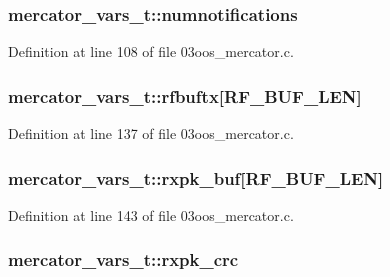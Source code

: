 \subsubsection[{\texorpdfstring{numnotifications}{numnotifications}}]{ mercator\+\_\+vars\+\_\+t\+::numnotifications}\hypertarget{structmercator__vars__t_a5c249c8cf98a5ffbaded6922aba7aac1}{}\label{structmercator__vars__t_a5c249c8cf98a5ffbaded6922aba7aac1}


Definition at line 108 of file 03oos\+\_\+mercator.\+c.

\subsubsection[{\texorpdfstring{rfbuftx}{rfbuftx}}]{ mercator\+\_\+vars\+\_\+t\+::rfbuftx\mbox{[}{\bf R\+F\+\_\+\+B\+U\+F\+\_\+\+L\+EN}\mbox{]}}\hypertarget{structmercator__vars__t_a19c0f384353ae7381a4935a5d378cd76}{}\label{structmercator__vars__t_a19c0f384353ae7381a4935a5d378cd76}


Definition at line 137 of file 03oos\+\_\+mercator.\+c.

\subsubsection[{\texorpdfstring{rxpk\+\_\+buf}{rxpk_buf}}]{ mercator\+\_\+vars\+\_\+t\+::rxpk\+\_\+buf\mbox{[}{\bf R\+F\+\_\+\+B\+U\+F\+\_\+\+L\+EN}\mbox{]}}\hypertarget{structmercator__vars__t_a5ade54535378ed5148eccc7e4b6e5ab7}{}\label{structmercator__vars__t_a5ade54535378ed5148eccc7e4b6e5ab7}


Definition at line 143 of file 03oos\+\_\+mercator.\+c.

\subsubsection[{\texorpdfstring{rxpk\+\_\+crc}{rxpk_crc}}]{ mercator\+\_\+vars\+\_\+t\+::rxpk\+\_\+crc}\hypertarget{structmercator__vars__t_aa0fca655c9b4f901d99f65da52aaa153}{}\label{structmercator__vars__t_aa0fca655c9b4f901d99f65da52aaa153}


